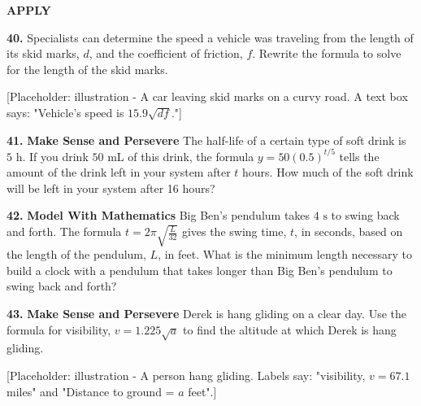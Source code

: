 \documentclass{article}
\newenvironment{practice}[2]{\noindent\textbf{#1.}}{}
\newcommand{\placeholder}[2]{[Placeholder: #1 - #2]}
\begin{document}
\clearpage

\begin{minipage}[t]{0.45\textwidth}
\textbf{\large APPLY}

\begin{practice}{40}{}
Specialists can determine the speed a vehicle was traveling from the length of its skid marks, $d$, and the coefficient of friction, $f$. Rewrite the formula to solve for the length of the skid marks.

\placeholder{illustration}{A car leaving skid marks on a curvy road. A text box says: "Vehicle's speed is $15.9\sqrt{df}$."}
\end{practice}

\begin{practice}{41}{}
\textbf{Make Sense and Persevere} The half-life of a certain type of soft drink is $5\text{ h}$. If you drink $50\text{ mL}$ of this drink, the formula $y = 50(0.5)^{t/5}$ tells the amount of the drink left in your system after $t$ hours. How much of the soft drink will be left in your system after 16 hours?
\end{practice}

\begin{practice}{42}{}
\textbf{Model With Mathematics} Big Ben's pendulum takes $4\text{ s}$ to swing back and forth. The formula $t = 2\pi\sqrt{\frac{L}{32}}$ gives the swing time, $t$, in seconds, based on the length of the pendulum, $L$, in feet. What is the minimum length necessary to build a clock with a pendulum that takes longer than Big Ben's pendulum to swing back and forth?
\end{practice}

\begin{practice}{43}{}
\textbf{Make Sense and Persevere} Derek is hang gliding on a clear day. Use the formula for visibility, $v = 1.225\sqrt{a}$ to find the altitude at which Derek is hang gliding.

\placeholder{illustration}{A person hang gliding. Labels say: "visibility, $v = 67.1$ miles" and "Distance to ground = $a$ feet".}
\end{practice}
\end{minipage}
\hfill
\end{document}
